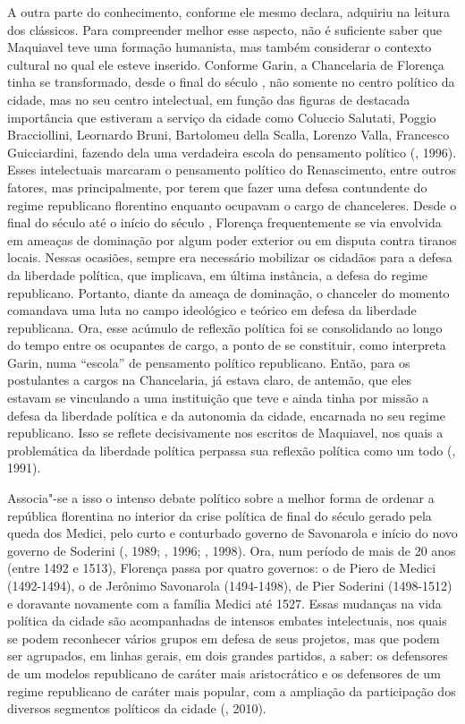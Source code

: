 A outra parte do conhecimento, conforme ele mesmo declara, adquiriu na
leitura dos clássicos. Para compreender melhor esse aspecto, não é
suficiente saber que Maquiavel teve uma formação humanista, mas também
considerar o contexto cultural no qual ele esteve inserido. Conforme
Garin, a Chancelaria de Florença tinha se transformado, desde o final do
século , não somente no centro político da cidade, mas no seu centro
intelectual, em função das figuras de destacada importância que
estiveram a serviço da cidade como Coluccio Salutati, Poggio
Bracciollini, Leornardo Bruni, Bartolomeu della Scalla, Lorenzo Valla,
Francesco Guicciardini, fazendo dela uma verdadeira escola do pensamento
político (, 1996). Esses intelectuais marcaram o pensamento
político do Renascimento, entre outros fatores, mas principalmente, por
terem que fazer uma defesa contundente do regime republicano florentino
enquanto ocupavam o cargo de chanceleres. Desde o final do século 
até o início do século , Florença frequentemente se via envolvida em
ameaças de dominação por algum poder exterior ou em disputa contra
tiranos locais. Nessas ocasiões, sempre era necessário mobilizar os
cidadãos para a defesa da liberdade política, que implicava, em última
instância, a defesa do regime republicano. Portanto, diante da ameaça de
dominação, o chanceler do momento comandava uma luta no campo ideológico
e teórico em defesa da liberdade republicana. Ora, esse acúmulo de
reflexão política foi se consolidando ao longo do tempo entre os
ocupantes de cargo, a ponto de se constituir, como interpreta Garin,
numa ``escola'' de pensamento político republicano. Então, para os
postulantes a cargos na Chancelaria, já estava claro, de antemão, que
eles estavam se vinculando a uma instituição que teve e ainda tinha por
missão a defesa da liberdade política e da autonomia da cidade,
encarnada no seu regime republicano. Isso se reflete decisivamente nos
escritos de Maquiavel, nos quais a problemática da liberdade política
perpassa sua reflexão política como um todo (, 1991).

Associa"-se a isso o intenso debate político sobre a melhor forma de
ordenar a república florentina no interior da crise política de final do
século  gerado pela queda dos Medici, pelo curto e conturbado governo
de Savonarola e início do novo governo de Soderini (, 1989;
, 1996; , 1998). Ora, num período de mais de 20 anos
(entre 1492 e 1513), Florença passa por quatro governos: o de Piero de
Medici (1492-1494), o de Jerônimo Savonarola (1494-1498), de Pier
Soderini (1498-1512) e doravante novamente com a família Medici até
1527. Essas mudanças na vida política da cidade são acompanhadas de
intensos embates intelectuais, nos quais se podem reconhecer vários
grupos em defesa de seus projetos, mas que podem ser agrupados, em
linhas gerais, em dois grandes partidos, a saber: os defensores de um
modelos republicano de caráter mais aristocrático e os defensores de um
regime republicano de caráter mais popular, com a ampliação da
participação dos diversos segmentos políticos da cidade (, 2010).


